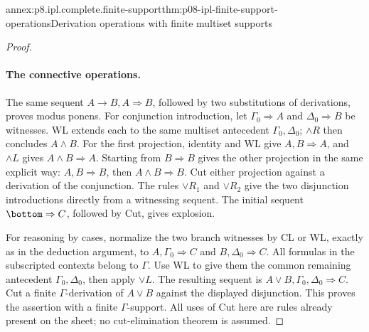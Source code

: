 \begin{annexitem}{annex:p8.ipl.complete.finite-support}{thm:p08-ipl-finite-support-operations}{Derivation operations with finite multiset supports}
\begin{proof}
\paragraph{The connective operations.}
The same sequent \(A\to B,A\Rightarrow B\), followed by two
substitutions of derivations, proves modus ponens. For conjunction
introduction, let \(\Gamma_0\Rightarrow A\) and
\(\Delta_0\Rightarrow B\) be witnesses. WL extends each to the
same multiset antecedent \(\Gamma_0,\Delta_0\); \(\land R\)
then concludes \(A\land B\). For the first projection, identity
and WL give \(A,B\Rightarrow A\), and \(\land L\) gives
\(A\land B\Rightarrow A\). Starting from \(B\Rightarrow B\)
gives the other projection in the same explicit way:
\(A,B\Rightarrow B\), then \(A\land B\Rightarrow B\).
Cut either projection against a derivation of the conjunction.
The rules \(\lor R_1\) and \(\lor R_2\) give the two disjunction
introductions directly from a witnessing sequent. The initial sequent
\(\bottom\Rightarrow C\), followed by Cut, gives explosion.

For reasoning by cases, normalize the two branch witnesses by CL or WL,
exactly as in the deduction argument, to
\(A,\Gamma_0\Rightarrow C\) and
\(B,\Delta_0\Rightarrow C\). All formulas in the subscripted
contexts belong to \(\Gamma\). Use WL to give them the common
remaining antecedent \(\Gamma_0,\Delta_0\), then apply
\(\lor L\). The resulting sequent is
\(A\lor B,\Gamma_0,\Delta_0\Rightarrow C\).
Cut a finite \(\Gamma\)-derivation of \(A\lor B\) against the
displayed disjunction. This proves the assertion with a finite
\(\Gamma\)-support. All uses of Cut here are rules already present
on the sheet; no cut-elimination theorem is assumed.
\end{proof}
\end{annexitem}

